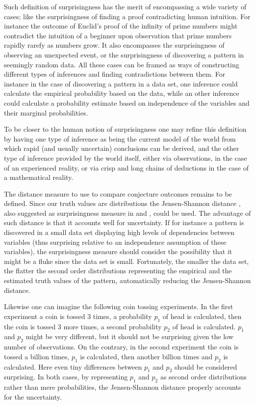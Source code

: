 \documentclass[runningheads]{llncs}
\begin{document}
Such definition of surprisingness has the merit of encompassing a wide
variety of cases; like the surprisingness of finding a proof
contradicting human intuition. For instance the outcome of Euclid's
proof of the infinity of prime numbers might contradict the intuition
of a beginner upon observation that prime numbers rapidly rarefy as
numbers grow. It also encompasses the surprisingness of observing an
unexpected event, or the surprisingness of discovering a pattern in
seemingly random data. All these cases can be framed as ways of
constructing different types of inferences and finding contradictions
between them. For instance in the case of discovering a pattern in a
data set, one inference could calculate the empirical probability
based on the data, while an other inference could calculate a
probability estimate based on independence of the variables and their
marginal probabilities.

To be closer to the human notion of surprisingness one may refine this
definition by having one type of inference as being the current model
of the world from which rapid (and usually uncertain) conclusions can
be derived, and the other type of inference provided by the world
itself, either via observations, in the case of an experienced
reality, or via crisp and long chains of deductions in the case of a
mathematical reality.

The distance measure to use to compare conjecture outcomes remains to
be defined. Since our truth values are distributions the
Jensen-Shannon distance \cite{Endres2003A}, also suggested as
surprisingness measure in \cite{Pienta2015AN} and
\cite{DerezinskiRH18}, could be used. The advantage of such distance
is that it accounts well for uncertainty. If for instance a pattern is
discovered in a small data set displaying high levels of dependencies
between variables (thus surprising relative to an independence
assumption of these variables), the surprisingness measure should
consider the possibility that it might be a fluke since the data set
is small. Fortunately, the smaller the data set, the flatter the
second order distributions representing the empirical and the
estimated truth values of the pattern, automatically reducing the
Jensen-Shannon distance.

Likewise one can imagine the following coin tossing experiments. In
the first experiment a coin is tossed 3 times, a probability $p_1$ of
head is calculated, then the coin is tossed 3 more times, a second
probability $p_2$ of head is calculated. $p_1$ and $p_2$ might be very
different, but it should not be surprising given the low number of
observations. On the contrary, in the second experiment the coin is
tossed a billion times, $p_1$ is calculated, then another billion
times and $p_2$ is calculated. Here even tiny differences between
$p_1$ and $p_2$ should be considered surprising. In both cases, by
representing $p_1$ and $p_2$ as second order distributions rather than
mere probabilities, the Jensen-Shannon distance properly accounts for
the uncertainty.
\end{document}
